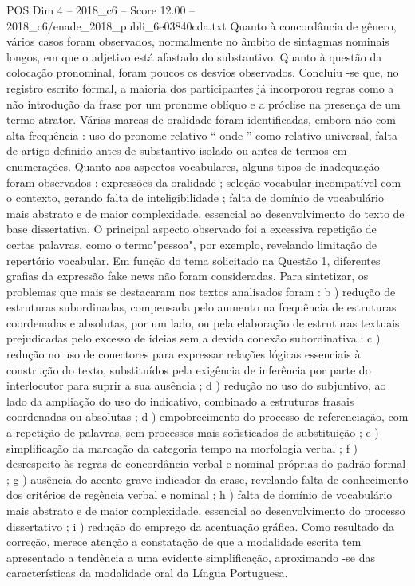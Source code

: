 \begin{textsample}{POS Dim 4 – 2018\_c6 – Score 12.00 – 2018\_c6/enade\_2018\_publi\_6e03840cda.txt}
Quanto à concordância de gênero, vários casos foram observados, normalmente no âmbito de sintagmas nominais longos, em que o adjetivo está afastado do substantivo.
Quanto à questão da colocação pronominal, foram poucos os desvios observados.
Concluiu -se que, no registro escrito formal, a maioria dos participantes já incorporou regras como a não introdução da frase por um pronome oblíquo e a próclise na presença de um termo atrator.
Várias marcas de oralidade foram identificadas, embora não com alta frequência : uso do pronome relativo “ onde ” como relativo universal, falta de artigo definido antes de substantivo isolado ou antes de termos em enumerações.
Quanto aos aspectos vocabulares, alguns tipos de inadequação foram observados : expressões da oralidade ; seleção vocabular incompatível com o contexto, gerando falta de inteligibilidade ; falta de domínio de vocabulário mais abstrato e de maior complexidade, essencial ao desenvolvimento do texto de base dissertativa.
O principal aspecto observado foi a excessiva repetição de certas palavras, como o termo"pessoa", por exemplo, revelando limitação de repertório vocabular.
Em função do tema solicitado na Questão 1, diferentes grafias da expressão fake news não foram consideradas.
Para sintetizar, os problemas que mais se destacaram nos textos analisados foram : b ) redução de estruturas subordinadas, compensada pelo aumento na frequência de estruturas coordenadas e absolutas, por um lado, ou pela elaboração de estruturas textuais prejudicadas pelo excesso de ideias sem a devida conexão subordinativa ; c ) redução no uso de conectores para expressar relações lógicas essenciais à construção do texto, substituídos pela exigência de inferência por parte do interlocutor para suprir a sua ausência ; d ) redução no uso do subjuntivo, ao lado da ampliação do uso do indicativo, combinado a estruturas frasais coordenadas ou absolutas ; d ) empobrecimento do processo de referenciação, com a repetição de palavras, sem processos mais sofisticados de substituição ; e ) simplificação da marcação da categoria tempo na morfologia verbal ; f ) desrespeito às regras de concordância verbal e nominal próprias do padrão formal ; g ) ausência do acento grave indicador da crase, revelando falta de conhecimento dos critérios de regência verbal e nominal ; h ) falta de domínio de vocabulário mais abstrato e de maior complexidade, essencial ao desenvolvimento do processo dissertativo ; i ) redução do emprego da acentuação gráfica.
Como resultado da correção, merece atenção a constatação de que a modalidade escrita tem apresentado a tendência a uma evidente simplificação, aproximando -se das características da modalidade oral da Língua Portuguesa.

\end{textsample}
